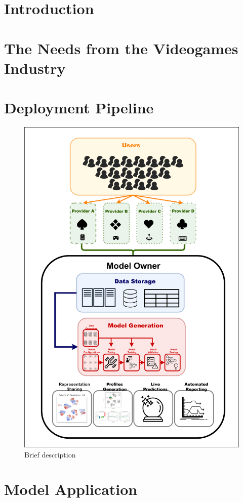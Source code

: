 \section{Introduction}
\label{industry_needs}
\lorem

\section{The Needs from the Videogames Industry}
\label{industry_needs}
\lorem

\section{Deployment Pipeline}
\label{industry_needs}
\begin{figure}[ht]
\centering
\includegraphics[width=\textwidth]{images/chapter_5/pipeline.png}
\caption[\textbf{Model Deployment Pipeline}]{Brief description}
\label{pipeline}
\end{figure}


\section{Model Application}
\label{industry_needs}
\lorem